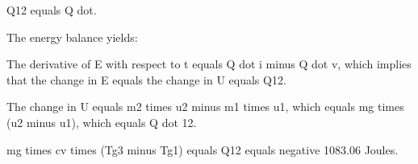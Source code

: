 Q12 equals Q dot.

The energy balance yields:

The derivative of E with respect to t equals Q dot i minus Q dot v, which implies that the change in E equals the change in U equals Q12.

The change in U equals m2 times u2 minus m1 times u1, which equals mg times (u2 minus u1), which equals Q dot 12.

mg times cv times (Tg3 minus Tg1) equals Q12 equals negative 1083.06 Joules.